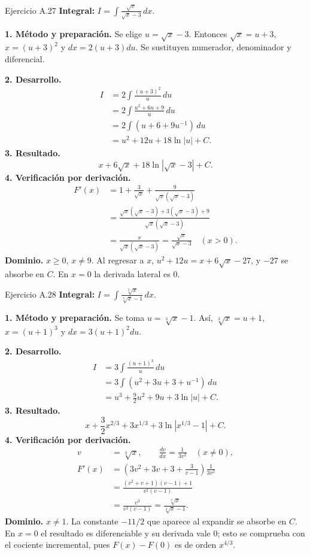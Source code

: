\begin{examplebox}{Ejercicio A.27}
\textbf{Integral:} $\displaystyle I=\int \frac{\sqrt x}{\sqrt x-3}\,dx$.

\textbf{1. Método y preparación.} Se elige $u=\sqrt x-3$. Entonces $\sqrt x=u+3$, $x=(u+3)^2$ y $dx=2(u+3)du$. Se sustituyen numerador, denominador y diferencial.

\textbf{2. Desarrollo.}
\begin{align*}
I&=2\int\frac{(u+3)^2}{u}\,du\\&=2\int\frac{u^2+6u+9}{u}\,du\\&=2\int(u+6+9u^{-1})\,du\\&=u^2+12u+18\ln|u|+C.
\end{align*}
\textbf{3. Resultado.}
\[
x+6\sqrt x+18\ln|\sqrt x-3|+C.
\]
\textbf{4. Verificación por derivación.}
\begin{align*}
F'(x)&=1+\frac3{\sqrt x}+\frac9{\sqrt x(\sqrt x-3)}\\&=\frac{\sqrt x(\sqrt x-3)+3(\sqrt x-3)+9}{\sqrt x(\sqrt x-3)}\\&=\frac{x}{\sqrt x(\sqrt x-3)}=\frac{\sqrt x}{\sqrt x-3}\quad(x>0).
\end{align*}
\textbf{Dominio.} $x\ge0$, $x\ne9$. Al regresar a $x$, $u^2+12u=x+6\sqrt x-27$, y $-27$ se absorbe en $C$. En $x=0$ la derivada lateral es $0$.
\end{examplebox}

\begin{examplebox}{Ejercicio A.28}
\textbf{Integral:} $\displaystyle I=\int \frac{\sqrt[3]x}{\sqrt[3]x-1}\,dx$.

\textbf{1. Método y preparación.} Se toma $u=\sqrt[3]x-1$. Así, $\sqrt[3]x=u+1$, $x=(u+1)^3$ y $dx=3(u+1)^2du$.

\textbf{2. Desarrollo.}
\begin{align*}
I&=3\int\frac{(u+1)^3}{u}\,du\\&=3\int(u^2+3u+3+u^{-1})\,du\\&=u^3+\frac92u^2+9u+3\ln|u|+C.
\end{align*}
\textbf{3. Resultado.}
\[
x+\frac32x^{2/3}+3x^{1/3}+3\ln|x^{1/3}-1|+C.
\]
\textbf{4. Verificación por derivación.}
\begin{align*}
v&=\sqrt[3]x,\qquad \frac{dv}{dx}=\frac1{3v^2}\quad(x\ne0),\\F'(x)&=\left(3v^2+3v+3+\frac3{v-1}\right)\frac1{3v^2}\\&=\frac{(v^2+v+1)(v-1)+1}{v^2(v-1)}\\&=\frac{v^3}{v^2(v-1)}=\frac{\sqrt[3]x}{\sqrt[3]x-1}.
\end{align*}
\textbf{Dominio.} $x\ne1$. La constante $-11/2$ que aparece al expandir se absorbe en $C$. En $x=0$ el resultado es diferenciable y su derivada vale $0$; esto se comprueba con el cociente incremental, pues $F(x)-F(0)$ es de orden $x^{4/3}$.
\end{examplebox}

